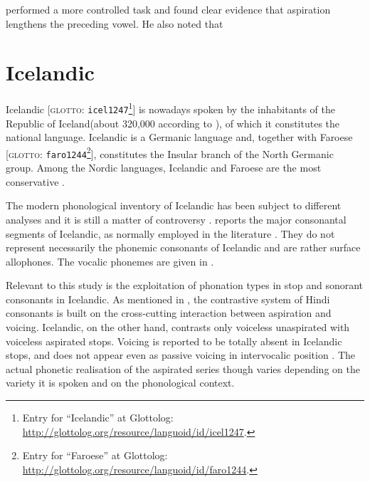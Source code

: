 \documentclass[11pt,a4paper,openany]{memoir}\usepackage[]{graphicx}\usepackage[]{color}
\begin{document}


\citet{durvasula2012} performed a more controlled task and found clear evidence that aspiration lengthens the preceding vowel.
He also noted that %

\section{Icelandic}

Icelandic [\textsc{glotto}: \texttt{icel1247}\footnote{Entry for ``Icelandic'' at Glottolog: \url{http://glottolog.org/resource/languoid/id/icel1247}.}] is nowadays spoken by the inhabitants of the Republic of Iceland(about 320,000 according to \citealt{arnason2011}), of which it constitutes the national language.
Icelandic is a Germanic language and, together with Faroese [\textsc{glotto}: \texttt{faro1244}\footnote{Entry for ``Faroese'' at Glottolog: \url{http://glottolog.org/resource/languoid/id/faro1244}.}], constitutes the Insular branch of the North Germanic group.
Among the Nordic languages, Icelandic and Faroese are the most conservative \citep{harbert2006,konig2013}.

The modern phonological inventory of Icelandic has been subject to different analyses and it is still a matter of controversy \citep{thraisson1978,jessen1998,arnason2011}.
 reports the major consonantal segments of Icelandic, as normally employed in the literature \citep[98]{arnason2011}.
They do not represent necessarily the phonemic consonants of Icelandic and are rather surface allophones.
The vocalic phonemes are given in  \citep[60]{arnason2011}.


Relevant to this study is the exploitation of phonation types in stop and sonorant consonants in Icelandic.
As mentioned in , the contrastive system of Hindi consonants is built on the cross-cutting interaction between aspiration and voicing.
Icelandic, on the other hand, contrasts only voiceless unaspirated with voiceless aspirated stops.
Voicing is reported to be totally absent in Icelandic stops, and does not appear even as passive voicing in intervocalic position \citep{arnason2011}.
The actual phonetic realisation of the aspirated series though varies depending on the variety it is spoken and on the phonological context.
\end{document}
